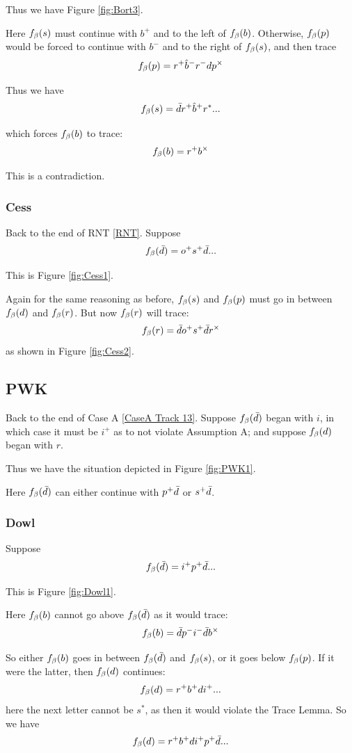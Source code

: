 Thus we have Figure \ref{fig:Bort3}.

Here $f_\beta(s)$ must continue with $b^+$ and to the left of $f_\beta(b)$. Otherwise, $f_\beta(p)$ would be forced to continue with $b^-$ and to the right of $f_\beta(s)$, and then trace
\[
f_\beta(p) = r^+ \hat{b}^- r^- d p^\times
\]

Thus we have
\[
f_\beta(s) = \bar{d} r^+ \hat{b}^+ r^*...
\]

which forces $f_\beta(b)$ to trace:
\[
f_\beta(b) = r^+ b^\times
\]

This is a contradiction.


\subsubsection{Cess}\label{Cess}
Back to the end of RNT \ref{RNT}. Suppose 
\[
f_\beta(\bar{d}) = o^+ s^+ \bar{d}...
\]

This is Figure \ref{fig:Cess1}.

Again for the same reasoning as before, $f_\beta(s)$ and $f_\beta(p)$ must go in between $f_\beta(d)$ and $f_\beta(r)$. But now $f_\beta(r)$ will trace:
\[
f_\beta(r) = \bar{d} o^+ s^+ \bar{d} r^\times
\]
as shown in Figure \ref{fig:Cess2}.

\subsection{PWK}\label{PWK}
Back to the end of Case A \ref{CaseA Track 13}. Suppose $f_\beta(\bar{d})$ began with $i$, in which case it must be $i^+$ as to not violate Assumption A; and suppose $f_\beta(d)$ began with $r$.

Thus we have the situation depicted in Figure \ref{fig:PWK1}.

Here $f_\beta(\bar{d})$ can either continue with $p^+ \bar{d}$ or $s^+ \bar{d}$.

\subsubsection{Dowl}\label{Dowl}
Suppose
\[
f_\beta(\bar{d}) = i^+ p^+ \bar{d}...
\]

This is Figure \ref{fig:Dowl1}.

Here $f_\beta(b)$ cannot go above $f_\beta(\bar{d})$ as it would trace:
\[
f_\beta(b) = \bar{d} p^- i^- \bar{d} b^\times
\]

So either $f_\beta(b)$ goes in between $f_\beta(\bar{d})$ and $f_\beta(s)$, or it goes below $f_\beta(p)$. If it were the latter, then $f_\beta(d)$ continues:
\[
f_\beta(d) = r^+ b^+ d i^+...
\]
here the next letter cannot be $s^*$, as then it would violate the Trace Lemma. So we have
\[
f_\beta(d) = r^+ b^+ d i^+ p^+ \bar{d}...
\]

